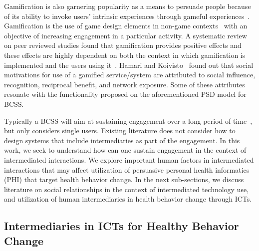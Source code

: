 \documentclass{sig-alternate}
\begin{document}
Gamification is also garnering popularity as a means to
persuade people because of its ability to invoke users' intrinsic experiences
through gameful experiences~\cite{hamari2014persuasive}. Gamification is the
use of game design elements in non-game contexts~\cite{deterding2011game} with
an objective of increasing engagement in a particular activity. A systematic
review on peer reviewed studies found that gamification provides positive
effects and these effects are highly dependent on both the context in which
gamification is implemented and the users using it~\cite{hamari2014does}.
Hamari and Koivisto~\cite{hamari2013social} found out that social motivations
for use of a gamified service/system are attributed to social influence,
recognition, reciprocal benefit, and network exposure. Some of these
attributes resonate with the functionality proposed on the aforementioned PSD
model for BCSS.

Typically a BCSS will aim at sustaining engagement over a long period of time~\cite{Oinas-Kukkonen:foundation}, but only considers single users. 
Existing literature does not consider how to design systems that include 
intermediaries
as part of the engagement. In this work, we seek to understand how
can one sustain engagement in the context of intermediated interactions. We
explore important human factors in intermediated interactions that may affect
utilization of persuasive personal health informatics (PHI) that target health
behavior change. In the next sub-sections, we discuss literature on social
relationships in the context of intermediated technology use, and utilization
of human intermediaries in health behavior change through ICTs.

\subsection{Intermediaries in ICTs for Healthy Behavior Change}
\end{document}
